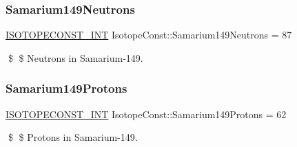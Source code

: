 \subsubsection{\texorpdfstring{Samarium149\+Neutrons}{Samarium149Neutrons}}
{\footnotesize\ttfamily \mbox{\hyperlink{group___isotope_const-_macros_ga5f18360b3e99483a35c32d789e62621c}{I\+S\+O\+T\+O\+P\+E\+C\+O\+N\+S\+T\+\_\+\+I\+NT}} Isotope\+Const\+::\+Samarium149\+Neutrons = 87}

\$ \$ Neutrons in Samarium-\/149. \mbox{\label{group___isotope_const-_samarium-_sm149_ga0e139df0e6084a6fe61961d01c0af4f3}} 
\subsubsection{\texorpdfstring{Samarium149\+Protons}{Samarium149Protons}}
{\footnotesize\ttfamily \mbox{\hyperlink{group___isotope_const-_macros_ga5f18360b3e99483a35c32d789e62621c}{I\+S\+O\+T\+O\+P\+E\+C\+O\+N\+S\+T\+\_\+\+I\+NT}} Isotope\+Const\+::\+Samarium149\+Protons = 62}

\$ \$ Protons in Samarium-\/149. 